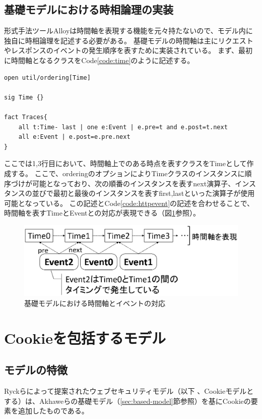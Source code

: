 \documentclass[12pt,a4paper]{jbook}
\begin{document}
\subsection{基礎モデルにおける時相論理の実装}
\label{sec:based-model-temporal-logic}
形式手法ツールAlloyは時間軸を表現する機能を元々持たないので、モデル内に独自に時相論理を記述する必要がある。
基礎モデルの時間軸は主にリクエストやレスポンスのイベントの発生順序を表すために実装されている。
まず、最初に時間軸となるクラスをCode\ref{code:time}のように記述する。
\begin{lstlisting}[caption=基礎モデルにおける時間軸, label=code:time]
open util/ordering[Time]

sig Time {}

fact Traces{
	all t:Time- last | one e:Event | e.pre=t and e.post=t.next
	all e:Event | e.post=e.pre.next
}
\end{lstlisting}
ここでは1,3行目において、時間軸上でのある時点を表すクラスをTimeとして作成する。
ここで、orderingのオプションによりTimeクラスのインスタンスに順序づけが可能となっており、次の順番のインスタンスを表すnext演算子、インスタンスの並びで最初と最後のインスタンスを表すfirst,lastといった演算子が使用可能となっている。
この記述とCode\ref{code:httpevent}の記述を合わせることで、時間軸を表すTimeとEventとの対応が表現できる（図\ref{fig:based-model-temporal-logic}参照）。

\begin{figure}[htb]
\centering
\includegraphics[width=400pt]{./fig/based-model-temporal-logic.eps}
\caption{基礎モデルにおける時間軸とイベントの対応}
\label{fig:based-model-temporal-logic}
\end{figure}

\section{Cookieを包括するモデル}
\subsection{モデルの特徴}
Ryckらによって提案されたウェブセキュリティモデル\cite{cookie-model}（以下
、Cookieモデルとする）は、Akhaweらの基礎モデル（\ref{sec:based-model}節参照）を基にCookieの要素を追加したものである。
\end{document}
